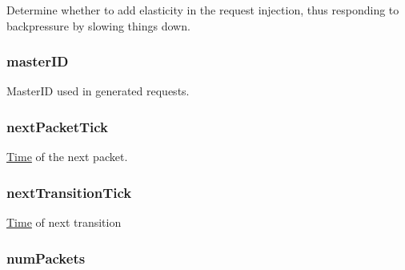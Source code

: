 Determine whether to add elasticity in the request injection, thus responding to backpressure by slowing things down. \hypertarget{classTrafficGen_aa8528db52f6eb976baecb2291d1b408a}{
\subsubsection[{masterID}]{ {\bf masterID}}}
\label{classTrafficGen_aa8528db52f6eb976baecb2291d1b408a}
MasterID used in generated requests. \hypertarget{classTrafficGen_a52d98e2f5ed0bf508db823995ad4940f}{
\subsubsection[{nextPacketTick}]{ {\bf nextPacketTick}}}
\label{classTrafficGen_a52d98e2f5ed0bf508db823995ad4940f}
\hyperlink{classTime}{Time} of the next packet. \hypertarget{classTrafficGen_aaa2a440da39850c0d2d678fd2ee844af}{
\subsubsection[{nextTransitionTick}]{ {\bf nextTransitionTick}}}
\label{classTrafficGen_aaa2a440da39850c0d2d678fd2ee844af}
\hyperlink{classTime}{Time} of next transition \hypertarget{classTrafficGen_a5ffd7b0e5641784cc4c40547e51c6cbc}{
\subsubsection[{numPackets}]{ {\bf numPackets}}}
\label{classTrafficGen_a5ffd7b0e5641784cc4c40547e51c6cbc}
